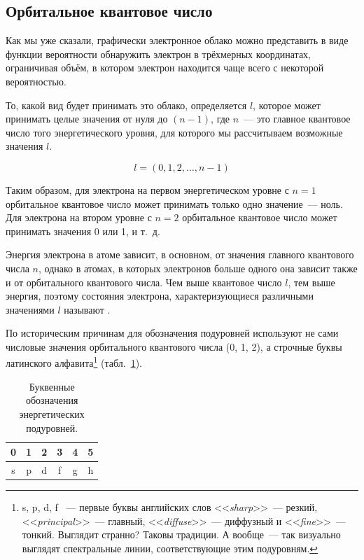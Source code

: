 \subsection*{Орбитальное квантовое число}

Как мы уже сказали, графически электронное облако можно представить в виде функции вероятности обнаружить электрон в трёхмерных координатах, ограничивая объём, в котором электрон находится чаще всего с некоторой вероятностью.

То, какой вид будет принимать это облако, определяется  $l$, которое может принимать целые значения от нуля до $(n - 1)$, где $n$~--- это главное квантовое число того энергетического уровня, для которого мы рассчитываем возможные значения $l$.

\begin{equation*}
    \boxed{l = (0,1,2, \ldots ,n - 1)}
\end{equation*}

Таким образом, для электрона на первом энергетическом уровне с $n = 1$ орбитальное квантовое число может принимать только одно значение~--- ноль. Для электрона на втором уровне с $n = 2$ орбитальное квантовое число может принимать значения 0 или 1, и т.~д.

Энергия электрона в атоме зависит, в основном, от значения главного квантового числа $n$, однако в атомах, в которых электронов больше одного она зависит также и от орбитального квантового числа. Чем выше квантовое число $l$, тем выше энергия, поэтому состояния электрона, характеризующиеся различными значениями $l$ называют .

По историческим причинам для обозначения подуровней используют не сами числовые значения орбитального квантового числа (0, 1, 2), а строчные буквы латинского алфавита\footnote{s, p, d, f ~--- первые буквы английских слов <<\textit{sharp}>>~--- резкий, <<\textit{principal}>>~--- главный, <<\textit{diffuse}>>~--- диффузный и <<\textit{fine}>>~--- тонкий. Выглядит странно? Таковы традиции. А вообще~--- так визуально выглядят спектральные линии, соответствующие этим подуровням.} (табл.~\ref{tab:letter_designations_of_energy_sublevels}).

\begin{table}[htbp]
    \small
    \centering
    \caption{Буквенные обозначения энергетических подуровней.}
    \label{tab:letter_designations_of_energy_sublevels}
    \begin{tabular}{cccccc}
        \hline
        \rowcolor{table_header}
        0 & 1 & 2 & 3 & 4 & 5\\
        \hline
        s & p & d & f & g & h\\
        \hline
    \end{tabular}
\end{table}

